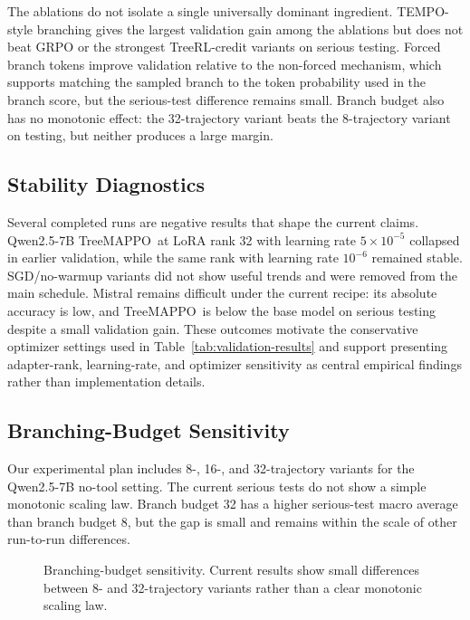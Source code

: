 \documentclass{article}
\newcommand{\ours}{TreeMAPPO}
\begin{document}
The ablations do not isolate a single universally dominant ingredient. TEMPO-style branching gives the largest validation gain among the ablations but does not beat GRPO or the strongest TreeRL-credit variants on serious testing. Forced branch tokens improve validation relative to the non-forced mechanism, which supports matching the sampled branch to the token probability used in the branch score, but the serious-test difference remains small. Branch budget also has no monotonic effect: the 32-trajectory variant beats the 8-trajectory variant on testing, but neither produces a large margin.

\subsection{Stability Diagnostics}
Several completed runs are negative results that shape the current claims. Qwen2.5-7B \ours\ at LoRA rank 32 with learning rate $5\times10^{-5}$ collapsed in earlier validation, while the same rank with learning rate $10^{-6}$ remained stable. SGD/no-warmup variants did not show useful trends and were removed from the main schedule. Mistral remains difficult under the current recipe: its absolute accuracy is low, and \ours\ is below the base model on serious testing despite a small validation gain. These outcomes motivate the conservative optimizer settings used in Table~\ref{tab:validation-results} and support presenting adapter-rank, learning-rate, and optimizer sensitivity as central empirical findings rather than implementation details.

\subsection{Branching-Budget Sensitivity}
Our experimental plan includes 8-, 16-, and 32-trajectory variants for the Qwen2.5-7B no-tool setting. The current serious tests do not show a simple monotonic scaling law. Branch budget 32 has a higher serious-test macro average than branch budget 8, but the gap is small and remains within the scale of other run-to-run differences.

\begin{figure}[t]
\centering
{}
\caption{Branching-budget sensitivity. Current results show small differences between 8- and 32-trajectory variants rather than a clear monotonic scaling law.}
\label{fig:branch-budget}
\end{figure}
\end{document}
